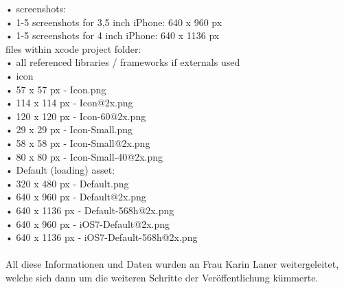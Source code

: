 • screenshots:\\
• 1-5 screenshots for 3,5 inch iPhone: 640 x 960 px\\
• 1-5 screenshots for 4 inch iPhone: 640 x 1136 px\\
files within xcode project folder:\\
• all referenced libraries / frameworks if externals used\\
• icon\\
• 57 x 57 px - Icon.png\\
• 114 x 114 px - Icon@2x.png\\
• 120 x 120 px - Icon-60@2x.png\\
• 29 x 29 px - Icon-Small.png\\
• 58 x 58 px - Icon-Small@2x.png\\
• 80 x 80 px - Icon-Small-40@2x.png\\
• Default (loading) asset:\\
• 320 x 480 px - Default.png\\
• 640 x 960 px - Default@2x.png\\
• 640 x 1136 px - Default-568h@2x.png\\
• 640 x 960 px - iOS7-Default@2x.png\\
• 640 x 1136 px - iOS7-Default-568h@2x.png\\
\\
All diese Informationen und Daten wurden an Frau Karin Laner weitergeleitet, welche sich dann um die weiteren Schritte der Veröffentlichung kümmerte.\\

%
%
% 
%
